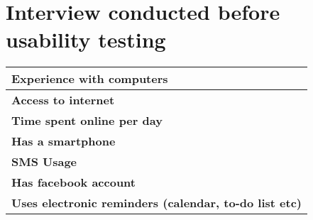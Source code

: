\chapter{Interview conducted before usability testing}
\label{app:interviews-before-usability-testing}


\begin{center}
	\begin{tabular}{ | p{13.5cm} | }
		\hline
		\textbf{Experience with computers} \\[5ex] \hline
		\textbf{Access to internet} \\[5ex] \hline
		\textbf{Time spent online per day} \\[5ex] \hline
		\textbf{Has a smartphone} \\[5ex] \hline
		\textbf{SMS Usage} \\[5ex] \hline
		\textbf{Has facebook account} \\[5ex] \hline
		\textbf{Uses electronic reminders (calendar, to-do list etc)} \\ [5ex] \hline
	\end{tabular}
\end{center}
